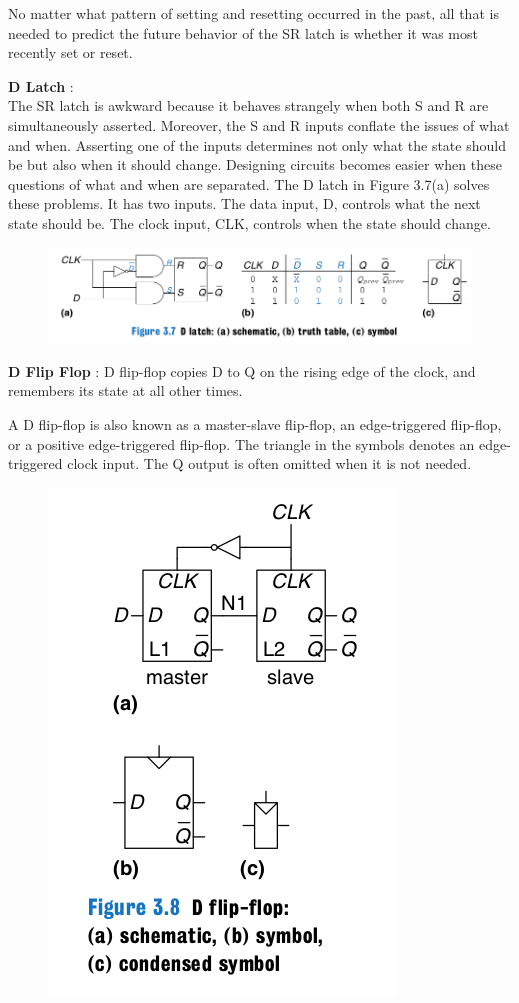 \documentclass{article}[12pt]
\begin{document}
No matter what pattern of
setting and resetting occurred in the past, all that is needed to predict
the future behavior of the SR latch is whether it was most recently set
or reset.

\textbf{D Latch} : \\ 
The SR latch is awkward because it behaves strangely when both S and
R are simultaneously asserted. Moreover, the S and R inputs conflate
the issues of what and when. Asserting one of the inputs determines
not only what the state should be but also when it should change.
Designing circuits becomes easier when these questions of what and
when are separated. The D latch in Figure 3.7(a) solves these problems.
It has two inputs. The data input, D, controls what the next state
should be. The clock input, CLK, controls when the state should
change.

\begin{figure}[htbp]
\centerline{\includegraphics[scale = 0.3]{../Images/d-latch.png}}
\end{figure}

\textbf{D Flip Flop} : 
D flip-flop copies D to Q on the rising edge of the
clock, and remembers its state at all other times.

A D flip-flop is also known as a master-slave flip-flop, an edge-triggered
flip-flop, or a positive edge-triggered flip-flop. The triangle in the symbols
denotes an edge-triggered clock input. The Q output is often omitted when
it is not needed.

\begin{figure}[htbp]
\centerline{\includegraphics[scale = 0.3]{../Images/d-flip-flop.png}}
\end{figure}
\end{document}
